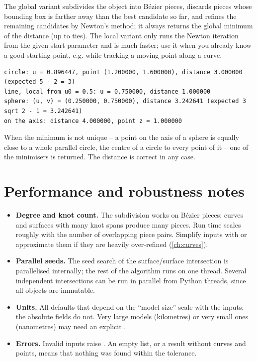 The global variant subdivides the object into Bézier pieces, discards pieces whose bounding
box is farther away than the best candidate so far, and refines the remaining candidates by
Newton's method; it always returns the global minimum of the distance (up to ties). The
local variant only runs the Newton iteration from the given start parameter and is much
faster; use it when you already know a good starting point, e.g. while tracking a moving
point along a curve.


\begin{lstlisting}[style=text]
circle: u = 0.896447, point (1.200000, 1.600000), distance 3.000000 (expected 5 - 2 = 3)
line, local from u0 = 0.5: u = 0.750000, distance 1.000000
sphere: (u, v) = (0.250000, 0.750000), distance 3.242641 (expected 3 sqrt 2 - 1 = 3.242641)
on the axis: distance 4.000000, point z = 1.000000
\end{lstlisting}

When the minimum is not unique -- a point on the axis of a sphere is equally close to a
whole parallel circle, the centre of a circle to every point of it -- one of the minimisers
is returned. The distance is correct in any case.

\section{Performance and robustness notes}\label{sec:isect-notes}

\begin{itemize}
\item \textbf{Degree and knot count.} The subdivision works on Bézier pieces; curves and
surfaces with many knot spans produce many pieces. Run time scales roughly with the number of
overlapping piece pairs. Simplify inputs with  or approximate them if they
are heavily over-refined (\cref{ch:curves}).
\item \textbf{Parallel seeds.} The seed search of the surface/surface intersection is
parallelised internally; the rest of the algorithm runs on one thread. Several independent
intersections can be run in parallel from Python threads, since all objects are immutable.
\item \textbf{Units.} All defaults that depend on the ``model size'' scale with the inputs;
the absolute  fields do not. Very large models (kilometres) or very small ones
(nanometres) may need an explicit .
\item \textbf{Errors.} Invalid inputs raise . An empty list, or a
result without curves and points, means that nothing was found within the tolerance.
\end{itemize}

